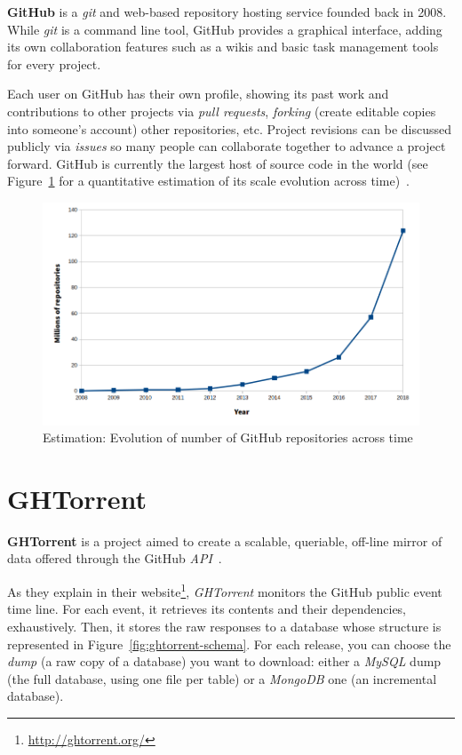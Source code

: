 \documentclass[a4paper, 12pt]{book}
\begin{document}
\textbf{GitHub} is a \emph{git} and web-based repository hosting service founded back in 2008. While \emph{git} is a command
line tool, GitHub provides a graphical interface, adding its own collaboration features such as a wikis and basic task
management tools for every project.

Each user on GitHub has their own profile, showing its past work and contributions to
other projects via \textit{pull requests}, \textit{forking} (create editable copies into someone's account) other repositories, etc.
Project revisions can be discussed publicly via \textit{issues} so many people can collaborate together to advance a project
forward. GitHub is currently the largest host of source code in the world (see Figure~\ref{fig:total-repo-number} for a quantitative
estimation of its scale evolution across time)~\cite{dabbish2012social}.

\begin{figure}
  \centering
  \includegraphics[width=14cm, keepaspectratio]{img/number-github-repos}
  \caption{Estimation: Evolution of number of GitHub repositories across time}
  \label{fig:total-repo-number}
\end{figure}

\section{GHTorrent}
\label{sec:ghtorrent}

\textbf{GHTorrent} is a project aimed to create a scalable, queriable, off-line mirror of data offered through the GitHub \textit{API}~\cite{Gousi13}.

As they explain in their website\footnote{\url{http://ghtorrent.org/}}, \emph{GHTorrent} monitors the GitHub public event time line.
For each event, it retrieves its contents and their dependencies, exhaustively. Then, it stores the raw responses to a database whose
structure is represented in Figure~\ref{fig:ghtorrent-schema}.
For each release, you can choose the \textit{dump} (a raw copy of a database) you want to download: either a \emph{MySQL} dump
(the full database, using one file per table) or a \emph{MongoDB} one (an incremental database).
\end{document}
